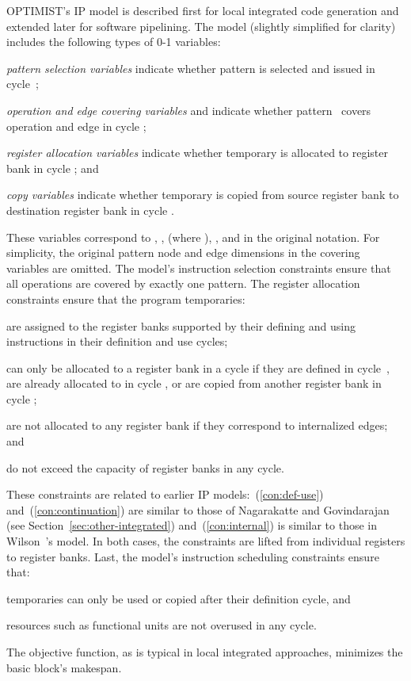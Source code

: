 \documentclass[acmsmall,authorversion,nonacm]{acmart}
\newcommand{\var}[2]{}
\begin{document}
OPTIMIST's IP model is described first for local integrated code
generation and extended later for software pipelining.
The model (slightly simplified for clarity) includes the following
types of 0-1 variables:
\begin{inparaitem}[]
\item \emph{pattern selection variables} \var{s}{p,k} indicate
  whether pattern  is selected and issued in cycle~;
\item \emph{operation and edge covering variables} \var{c}{p,o,k}
  and \var{c}{p,e,k} indicate whether pattern~ covers operation
   and edge  in cycle ;
\item \emph{register allocation variables} \var{a}{t,b,k} indicate
  whether temporary  is allocated to register bank  in cycle
  ; and
\item \emph{copy variables} \var{x}{t,s,d,k} indicate whether
  temporary  is copied from source register bank  to destination
  register bank  in cycle .
\end{inparaitem}
These variables correspond to , , 
(where ), , and  in the
original notation.
For simplicity, the original pattern node and edge dimensions in the
covering variables are omitted.
The model's instruction selection constraints ensure that all
operations are covered by exactly one pattern.
The register allocation constraints ensure that the program
temporaries:
\begin{inparaenum}
\item are assigned to the register banks supported by their defining
  and using instructions in their definition and use cycles;
  \label{con:def-use}
\item can only be allocated to a register bank  in a cycle  if
  they are defined in cycle~, are already allocated to  in cycle
  , or are copied from another register bank in cycle ;
  \label{con:continuation}
\item are not allocated to any register bank if they correspond to
  internalized edges; and
  \label{con:internal}
\item do not exceed the capacity of register banks in any cycle.
\end{inparaenum}
These constraints are related to earlier IP
models:~(\ref{con:def-use}) and~(\ref{con:continuation}) are similar
to those of Nagarakatte and Govindarajan (see
Section~\ref{sec:other-integrated})
and~(\ref{con:internal}) is similar to those in Wilson~\etal{}'s
model.
In both cases, the constraints are lifted from individual registers to
register banks.
Last, the model's instruction scheduling constraints ensure that:
\begin{inparaitem}[]
\item temporaries can only be used or copied after their definition
  cycle, and
\item resources such as functional units are not overused in any
  cycle.
\end{inparaitem}
The objective function, as is typical in local integrated approaches,
minimizes the basic block's makespan.
\end{document}
